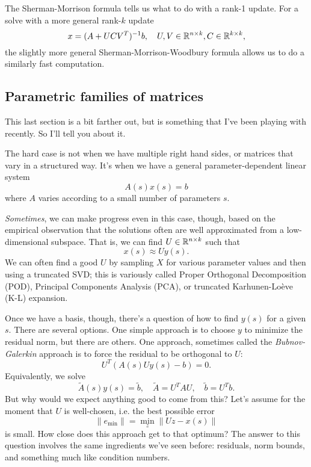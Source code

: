 \documentclass[12pt, leqno]{article}
\begin{document}
The Sherman-Morrison formula tells us what to do with a rank-1 update.
For a solve with a more general rank-$k$ update
\[
  x = (A+UCV^T)^{-1} b, \quad U, V \in \mathbb{R}^{n \times k}, C \in
  \mathbb{R}^{k \times k},
\]
the slightly more general Sherman-Morrison-Woodbury formula allows
us to do a similarly fast computation.

\subsection*{Parametric families of matrices}

This last section is a bit farther out, but is something that I've
been playing with recently.  So I'll tell you about it.

The hard case is not when we have multiple right hand sides, or
matrices that vary in a structured way.  It's when we have a general
parameter-dependent linear system
\[
  A(s) x(s) = b
\]
where $A$ varies according to a small number of parameters $s$.

{\em Sometimes}, we can make progress even in this case, though, based on
the empirical observation that the solutions often are well
approximated from a low-dimensional subspace.  That is, we can
find $U \in \mathbb{R}^{n \times k}$ such that
\[
  x(s) \approx U y(s).
\]
We can often find a good $U$ by sampling $X$ for various parameter
values and then using a truncated SVD; this is variously called Proper
Orthogonal Decomposition (POD), Principal Components Analysis (PCA),
or truncated Karhunen-Lo\`eve (K-L) expansion.

Once we have a basis, though, there's a question of how to find $y(s)$
for a given $s$.  There are several options.  One simple approach is to
choose $y$ to minimize the residual norm, but there are others.  One
approach, sometimes called the {\em Bubnov-Galerkin} approach is to
force the residual to be orthogonal to $U$:
\[
  U^T \left( A(s) U y(s) - b \right) = 0.
\]
Equivalently, we solve
\[
  \tilde{A}(s) y(s) = \tilde{b}, \quad
  \tilde{A} = U^T A U, \quad
  \tilde{b} = U^T b.
\]
But why would we expect anything good to come from this?  Let's assume
for the moment that $U$ is well-chosen, i.e. the best possible error
\[
\|e_{\min}\| = \min_z \|Uz-x(s)\|
\]
is small.  How close does this approach get to that optimum?  The
answer to this question involves the same ingredients we've seen
before: residuals, norm bounds, and something much like condition
numbers.
\end{document}
